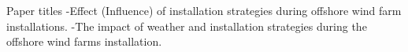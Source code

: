 Paper titles
-Effect (Influence) of installation strategies during offshore wind farm installations.
-The impact of weather and installation strategies during the offshore wind farms installation.
